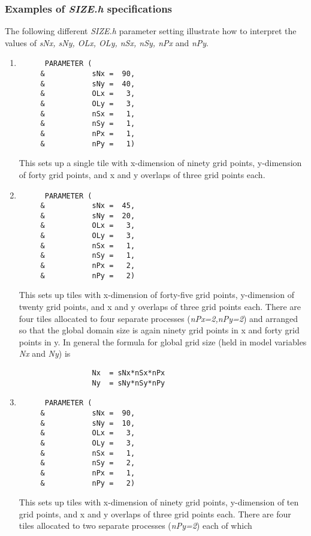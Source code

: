 \subsubsection{Examples of {\em SIZE.h} specifications}

The following different {\em SIZE.h} parameter setting illustrate how to
interpret the values of {\em sNx, sNy, OLx, OLy, nSx, nSy, nPx}
and {\em nPy}.
\begin{enumerate}
\item
\begin{verbatim}
      PARAMETER (
     &           sNx =  90,
     &           sNy =  40,
     &           OLx =   3,
     &           OLy =   3,
     &           nSx =   1,
     &           nSy =   1,
     &           nPx =   1,
     &           nPy =   1)
\end{verbatim}
This sets up a single tile with x-dimension of ninety grid points, y-dimension of
forty grid points, and x and y overlaps of three grid points each.
\item
\begin{verbatim}
      PARAMETER (
     &           sNx =  45,
     &           sNy =  20,
     &           OLx =   3,
     &           OLy =   3,
     &           nSx =   1,
     &           nSy =   1,
     &           nPx =   2,
     &           nPy =   2)
\end{verbatim}
This sets up tiles with x-dimension of forty-five grid points, y-dimension of
twenty grid points, and x and y overlaps of three grid points each. There are
four tiles allocated to four separate processes ({\em nPx=2,nPy=2}) and
arranged so that the global domain size is again ninety grid points in x and
forty grid points in y. In general the formula for global grid size (held in
model variables {\em Nx} and {\em Ny}) is
\begin{verbatim}
                 Nx  = sNx*nSx*nPx
                 Ny  = sNy*nSy*nPy
\end{verbatim}
\item
\begin{verbatim}
      PARAMETER (
     &           sNx =  90,
     &           sNy =  10,
     &           OLx =   3,
     &           OLy =   3,
     &           nSx =   1,
     &           nSy =   2,
     &           nPx =   1,
     &           nPy =   2)
\end{verbatim}
This sets up tiles with x-dimension of ninety grid points, y-dimension of
ten grid points, and x and y overlaps of three grid points each. There are
four tiles allocated to two separate processes ({\em nPy=2}) each of which

\end{enumerate}

